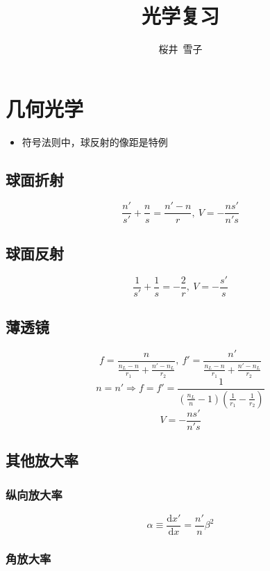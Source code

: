 \documentclass{article}
\title{光学复习}
\author{桜井\ 雪子}
\date{}
\begin{document}
\maketitle

\section{几何光学}

\begin{itemize}
    \item 符号法则中，球反射的像距是特例
\end{itemize}

\subsection{球面折射}

$$
\frac{n'}{s'}+\frac{n}{s}=\frac{n'-n}{r},\ V=-\frac{ns'}{n's}
$$

\subsection{球面反射}

$$
\frac{1}{s'}+\frac{1}{s}=-\frac{2}{r},\ V=-\frac{s'}{s}
$$

\subsection{薄透镜}

$$
f=\frac{n}{\frac{n_L-n}{r_1}+\frac{n'-n_L}{r_2}},\ f'=\frac{n'}{\frac{n_L-n}{r_1}+\frac{n'-n_L}{r_2}}
$$ $$
n=n'\Rightarrow f=f'=\frac{1}{\left(\frac{n_L}{n}-1\right)\left(\frac{1}{r_1}-\frac{1}{r_2}\right)}
$$ $$
V=-\frac{ns'}{n's}
$$

\subsection{其他放大率}

\subsubsection{纵向放大率}

$$
\alpha\equiv\frac{\mathrm{d}x'}{\mathrm{d}x}=\frac{n'}{n}\beta^2
$$

\subsubsection{角放大率}
\end{document}
